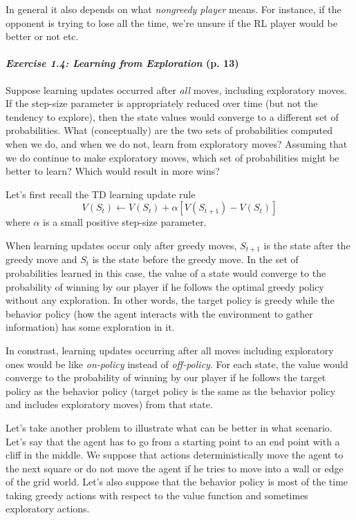 \documentclass[10pt,a4paper]{article}
\begin{document}
In general it also depends on what \textit{nongreedy player} means. For instance, if the opponent is trying to lose all the time, we're unsure if the RL player would be better or not etc.

\paragraph{\textit{Exercise 1.4: Learning from Exploration} (p. 13)} Suppose learning updates occurred after \textit{all} moves, including exploratory moves. If the step-size parameter is appropriately reduced over time (but not the tendency to explore), then the state values would converge to a different set of probabilities. What (conceptually) are the two sets of probabilities computed when we do, and when we do not, learn from exploratory moves? Assuming that we do continue to make exploratory moves, which set of probabilities might be better to learn? Which would result in more wins?

\bigskip
Let's first recall the TD learning update rule
\begin{equation}
V(S_t) \leftarrow V(S_t) + \alpha \left[V(S_{t+1}) - V(S_t)\right]
\end{equation}
where $\alpha$ is a small positive step-size parameter.

When learning updates occur only after greedy moves, $S_{t+1}$ is the state after the greedy move and $S_{t}$ is the state before the greedy move. In the set of probabilities learned in this case, the value of a state would converge to the probability of winning by our player if he follows the optimal greedy policy without any exploration. In other words, the target policy is greedy while the behavior policy (how the agent interacts with the environment to gather information) has some exploration in it.

In constrast, learning updates occurring after all moves including exploratory ones would be like \textit{on-policy} instead of \textit{off-policy}. For each state, the value would converge to the probability of winning by our player if he follows the target policy as the behavior policy (target policy is the same as the behavior policy and includes exploratory moves) from that state.

\bigskip
Let's take another problem to illustrate what can be better in what scenario. Let's say that the agent has to go from a starting point to an end point with a cliff in the middle. We suppose that actions deterministically move the agent to the next square or do not move the agent if he tries to move into a wall or edge of the grid world. Let's also suppose that the behavior policy is most of the time taking greedy actions with respect to the value function and sometimes exploratory actions.
\end{document}
